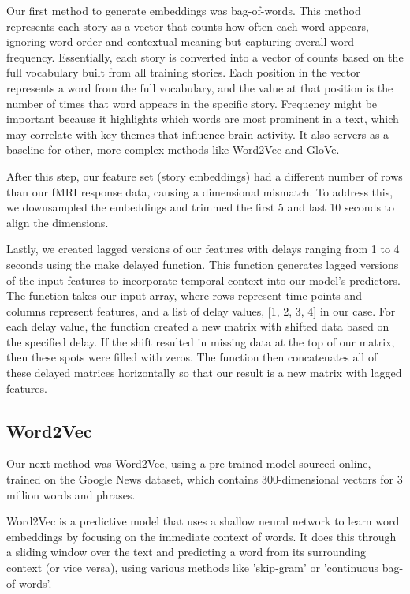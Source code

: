 \documentclass{article}
\begin{document}
Our first method to generate embeddings was bag-of-words. 
This method represents each story as a vector that counts how often each word appears, ignoring word order and contextual meaning but capturing overall word frequency. Essentially, each story is converted into a vector of counts based on the full vocabulary built from all training stories. Each position in the vector represents a word from the full vocabulary, and the value at that position is the number of times that word appears in the specific story. Frequency might be important because it highlights which words are most prominent in a text, which may correlate with key themes that influence brain activity. It also servers as a baseline for other, more complex methods like Word2Vec and GloVe. 

After this step, our feature set (story embeddings) had a different number of rows than our fMRI response data, causing a dimensional mismatch. To address this, we downsampled the embeddings and trimmed the first 5 and last 10 seconds to align the dimensions.

Lastly, we created lagged versions of our features with delays ranging from 1 to 4 seconds using the make delayed function. This function generates lagged versions of the input features to incorporate temporal context into our model's predictors. The function takes our input array, where rows represent time points and columns represent features, and a list of delay values, [1, 2, 3, 4] in our case. For each delay value, the function created a new matrix with shifted data based on the specified delay. If the shift resulted in missing data at the top of our matrix, then these spots were filled with zeros. The function then concatenates all of these delayed matrices horizontally so that our result is a new matrix with lagged features.

\subsection{Word2Vec}

Our next method was Word2Vec, using a pre-trained model sourced online, trained on the Google News dataset, which contains 300-dimensional vectors for 3 million words and phrases.

Word2Vec is a predictive model that uses a shallow neural network to learn word embeddings by focusing on the immediate context of words. It does this through a sliding window over the text and predicting a word from its surrounding context (or vice versa), using various methods like 'skip-gram' or 'continuous bag-of-words'. 
\end{document}
